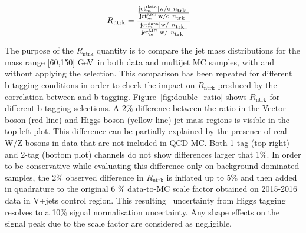 \begin{align}
    R_{\mathrm{ntrk}} &=
    \frac{
        \frac{ \mathrm{jet}_m^{\mathrm{data}} | \mathrm{w/o}~n\textsubscript{trk}~ }
        { \mathrm{jet}_m^{\mathrm{MC}}| \mathrm{w/o}~n\textsubscript{trk}~}
        }
        { \frac{\mathrm{jet}_m^{\mathrm{data}}| \mathrm{w/}~n\textsubscript{trk}~}{\mathrm{jet}_m^{\mathrm{MC}}| \mathrm{w/} ~n\textsubscript{trk}~} }
    \label{eq:doubleratio}
\end{align}

The purpose of the $R_{\mathrm{ntrk}}$ quantity is to compare the jet mass distributions for the mass range [60,150] GeV\ in both data and multijet MC samples, with and without applying the \ntrk selection.
This comparison has been repeated for different b-tagging conditions in order to check the impact on $R_{\mathrm{ntrk}}$ produced by the correlation between \ntrk and b-tagging.
Figure~\ref{fig:double_ratio} shows $R_{\mathrm{ntrk}}$ for different b-tagging selections.
A 2\% difference between the ratio in the Vector boson (red line) and Higgs boson (yellow line) jet mass regions is visible in the top-left plot.
This difference can be partially explained by the presence of real W/Z bosons in data that are not included in QCD MC.
Both 1-tag (top-right) and 2-tag (bottom plot) channels do not show differences larger that 1\%.
In order to be conservative while evaluating this difference only on background dominated samples, the 2\% observed difference in $R_{\mathrm{ntrk}}$ is inflated up to 5\% and then added in quadrature to the original 6 $\%$ data-to-MC \ntrk scale factor obtained on 2015-2016 data in V+jets control region.
This resulting \ntrk\ uncertainty from Higgs tagging resolves to a 10\% signal normalisation uncertainty.
Any shape effects on the signal peak due to the \ntrk scale factor are considered as negligible.


